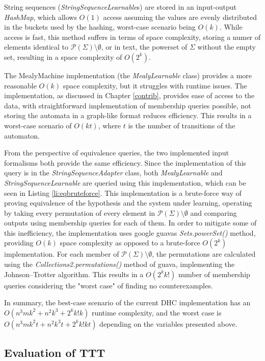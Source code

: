 String sequences (\emph{StringSequenceLearnable}s) are stored in an input-output \emph{HashMap}, which allows $O(1)$ access assuming the values are evenly distributed in the buckets used by the hashing, worst-case scenario being $O(k)$. While access is fast, this method suffers in terms of space complexity, storing a numer of elements identical to $\mathcal{P}(\Sigma)\setminus\emptyset$, or in text, the powerset of $\Sigma$ without the empty set, resulting in a space complexity of $O(2^k)$.

The MealyMachine implementation (the \emph{MealyLearnable} class) provides a more reasonable $O(k)$ space complexity, but it struggles with runtime issues. The implementation, as discussed in Chapter \ref{contrib}, provides ease of access to the data, with straightforward implementation of membership queries possible, not storing the automata in a graph-like format reduces efficiency. This results in a worst-case scenario of $O(kt)$, where $t$ is the number of transitions of the automaton.

From the perspective of equivalence queries, the two implemented input formalisms both provide the same efficiency. Since the implementation of this query is in the \emph{StringSequenceAdapter} class, both \emph{MealyLearnable} and \emph{StringSequenceLearnable} are queried using this implementation, which can be seen in Listing \ref{li:eqbruteforce}. This implementation is a brute-force way of proving equivalence of the hypothesis and the system under learning, operating by taking every permutation of every element in $\mathcal{P}(\Sigma)\setminus\emptyset$ and comparing outputs using membership queries for each of them. In order to mitigate some of this inefficiency, the implementation uses google guavas \emph{Sets.powerSet()} method, providing $O(k)$ space complexity as opposed to a brute-force $O(2^k)$ implementation. For each member of $\mathcal{P}(\Sigma)\setminus\emptyset$, the permutations are calculated using the \emph{Collections2.permutations()} method of guava, implementing the Johnson–Trotter algorithm. This results in a $O(2^kk!)$ number of membership queries considering the "worst case" of finding no counterexamples.

In summary, the best-case scenario of the current DHC implementation has an $O(n^3mk^2+n^2k^3+2^kk!k)$ runtime complexity, and the worst case is $O(n^3mk^2t+n^2k^3t+2^kk!kt)$ depending on the variables presented above.

\subsection{Evaluation of TTT}

